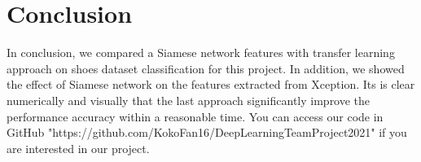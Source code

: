 \section{Conclusion}

In conclusion, we compared a Siamese network features with transfer learning approach on shoes dataset classification for this project. In addition, we showed the effect of Siamese network on the features extracted from Xception. Its is clear numerically and visually that the last approach significantly improve the performance accuracy within a reasonable time. You can access our code in GitHub "https://github.com/KokoFan16/DeepLearningTeamProject2021" if you are interested in our project. 